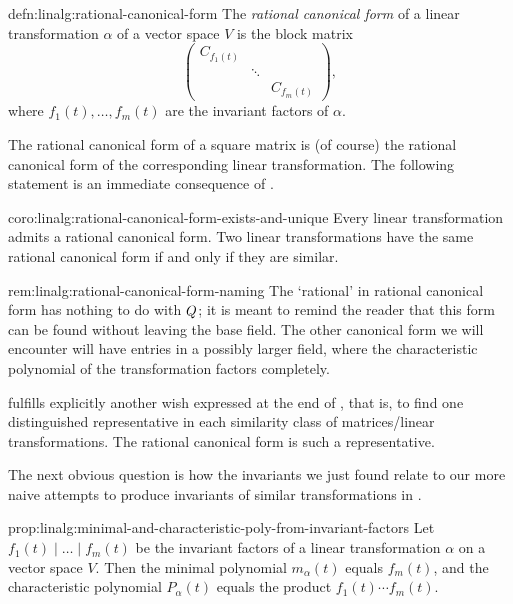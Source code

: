 \begin{defn}{}{defn:linalg:rational-canonical-form}
  The \emph{rational canonical form} of a linear transformation
  $\alpha$ of a vector space $V$ is the block matrix
  \[
    \begin{pmatrix}
      C_{f_1(t)} & & \\
                 & \ddots & \\
                 & & C_{f_m(t)}
    \end{pmatrix},
  \]
  where $f_1(t), \dots, f_m(t)$ are the invariant factors of $\alpha$.
\end{defn}

The rational canonical form of a square matrix is (of course) the
rational canonical form of the corresponding linear
transformation. The following statement is an immediate consequence of
.

\begin{coro}{}{coro:linalg:rational-canonical-form-exists-and-unique}
  Every linear transformation admits a rational canonical form. Two
  linear transformations have the same rational canonical form if and
  only if they are similar.
\end{coro}

\begin{rem}{}{rem:linalg:rational-canonical-form-naming}
  The `rational' in rational canonical form has nothing to do with
  $Q$; it is meant to remind the reader that this form can be found
  without leaving the base field. The other canonical form we will
  encounter will have entries in a possibly larger field, where the
  characteristic polynomial of the transformation factors completely.
\end{rem}

 fulfills explicitly another wish expressed
at the end of ,
that is, to find one distinguished representative in each similarity
class of matrices/linear transformations. The rational canonical form
is such a representative.

The next obvious question is how the invariants we just found relate
to our more naive attempts to produce invariants of similar
transformations in
.

\begin{prop}{}{prop:linalg:minimal-and-characteristic-poly-from-invariant-factors}
  Let $f_1(t) \mid \dots \mid f_m(t)$ be the invariant factors of a
  linear transformation $\alpha$ on a vector space $V$. Then the
  minimal polynomial $m_\alpha(t)$ equals $f_m(t)$, and the
  characteristic polynomial $P_\alpha(t)$ equals the product
  $f_1(t) \cdots f_m(t)$.
\end{prop}

